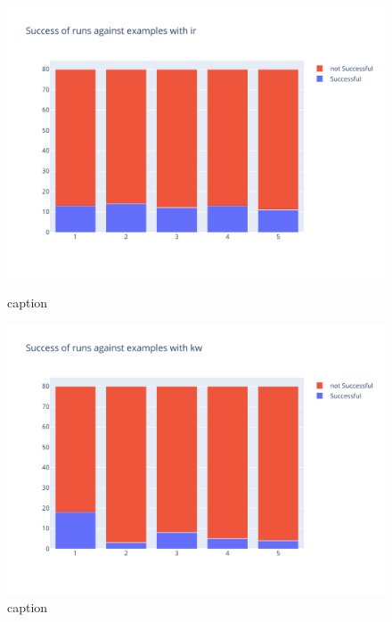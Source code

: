 \documentclass[\myrootdir/main.tex]{subfiles}
\begin{document}
\begin{figure}[hp]
	\centering
	\begin{minipage}{0.45\textwidth}
		\centering
		\includegraphics[width=\textwidth, clip]{img/big-study/success-examples-ir.pdf}
		\caption{caption}
		\label{fig:success-examples-ir}
	\end{minipage}\hfill
	\begin{minipage}{0.45\textwidth}
		\centering
		\includegraphics[width=\textwidth, clip]{img/big-study/success-examples-kw.pdf}
		\caption{caption}
		\label{fig:success-examples-kw}
	\end{minipage}
\end{figure}
\end{document}
